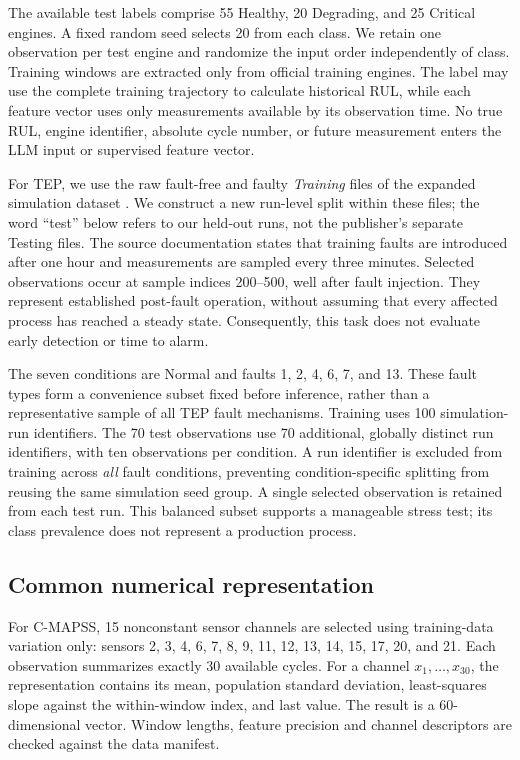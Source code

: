 \documentclass[11pt,a4paper]{article}
\begin{document}
The available test labels comprise 55 Healthy, 20 Degrading, and 25 Critical engines. A fixed random seed selects 20 from each class. We retain one observation per test engine and randomize the input order independently of class. Training windows are extracted only from official training engines. The label may use the complete training trajectory to calculate historical RUL, while each feature vector uses only measurements available by its observation time. No true RUL, engine identifier, absolute cycle number, or future measurement enters the LLM input or supervised feature vector.

For TEP, we use the raw fault-free and faulty \emph{Training} files of the expanded simulation dataset \citep{downs1993plant,rieth2017additional}. We construct a new run-level split within these files; the word ``test'' below refers to our held-out runs, not the publisher's separate Testing files. The source documentation states that training faults are introduced after one hour and measurements are sampled every three minutes. Selected observations occur at sample indices 200--500, well after fault injection. They represent established post-fault operation, without assuming that every affected process has reached a steady state. Consequently, this task does not evaluate early detection or time to alarm.

The seven conditions are Normal and faults 1, 2, 4, 6, 7, and 13. These fault types form a convenience subset fixed before inference, rather than a representative sample of all TEP fault mechanisms. Training uses 100 simulation-run identifiers. The 70 test observations use 70 additional, globally distinct run identifiers, with ten observations per condition. A run identifier is excluded from training across \emph{all} fault conditions, preventing condition-specific splitting from reusing the same simulation seed group. A single selected observation is retained from each test run. This balanced subset supports a manageable stress test; its class prevalence does not represent a production process.

\subsection{Common numerical representation}
For C-MAPSS, 15 nonconstant sensor channels are selected using training-data variation only: sensors 2, 3, 4, 6, 7, 8, 9, 11, 12, 13, 14, 15, 17, 20, and 21. Each observation summarizes exactly 30 available cycles. For a channel $x_1,\ldots,x_{30}$, the representation contains its mean, population standard deviation, least-squares slope against the within-window index, and last value. The result is a 60-dimensional vector. Window lengths, feature precision and channel descriptors are checked against the data manifest.
\end{document}
